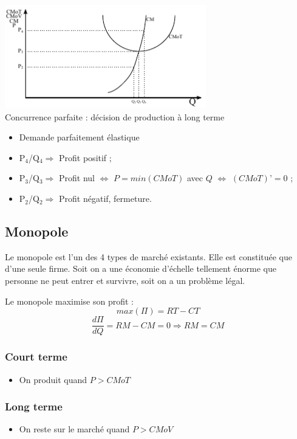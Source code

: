 \begin{center}
	\includegraphics[height=4.5cm]{images/graph_concurrence_parfaite_long_terme.pdf}\\
	Concurrence parfaite : décision de production à long terme
\end{center}
\begin{itemize}
	\item Demande parfaitement élastique
	\item P$_4$/Q$_4 \Rightarrow$ Profit positif ;
	\item P$_3$/Q$_3 \Rightarrow$ Profit nul $\Leftrightarrow$ $P = min( CMoT )$ avec $Q$ $\Leftrightarrow$ $(CMoT)’ = 0$ ;
	\item P$_2$/Q$_2 \Rightarrow$ Profit négatif, fermeture.
\end{itemize}



\subsection{Monopole}
Le monopole est l'un des 4 types de marché existants. Elle est constituée que d'une seule firme. Soit on a une économie d'échelle tellement énorme que personne ne peut entrer et survivre, soit on a un problème légal.

Le monopole maximise son profit :
$$max( \Pi ) = RT - CT$$
$$\frac{d\Pi}{dQ} = RM - CM = 0 \Rightarrow RM = CM$$



\subsubsection{Court terme}
\begin{itemize}
	\item On produit quand $P > CMoT$
\end{itemize}



\subsubsection{Long terme}
\begin{itemize}
	\item On reste sur le marché quand $P > CMoV$
\end{itemize}

